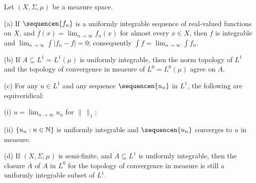 Let $(X,\Sigma,\mu)$ be a measure space.

\ifdim\pagewidth>467pt\fontdimen4\tenrm=1.5pt\fi
(a) If $\sequencen{f_n}$ is a uniformly integrable sequence of
real-valued functions on $X$, and $f(x)=\lim_{n\to\infty}f_n(x)$ for
almost every $x\in X$, then $f$ is integrable and
$\lim_{n\to\infty}\int|f_n-f|=0$;  consequently
$\int f=\lim_{n\to\infty}\int f_n$.
\tenrm=1.11pt

(b) If $A\subseteq L^1=L^1(\mu)$ is uniformly integrable, then the norm
topology of $L^1$ and the topology of convergence in measure of
$L^0=L^0(\mu)$ agree on $A$.

(c) For any $u\in L^1$ and any sequence $\sequencen{u_n}$ in $L^1$, the
following are equiveridical:

\qquad(i) $u=\lim_{n\to\infty}u_n$ for $\|\,\|_1$;

\qquad(ii) $\{u_n:n\in\Bbb N\}$ is uniformly integrable and
$\sequencen{u_n}$ converges to $u$ in measure.

(d) If $(X,\Sigma,\mu)$ is semi-finite, and $A\subseteq L^1$ is
uniformly integrable, then the closure $\overline{A}$ of $A$ in $L^0$
for the topology of convergence in measure is still a uniformly
integrable subset of $L^1$.

